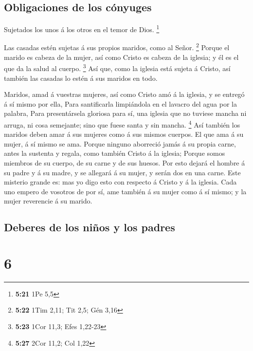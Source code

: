 \hypertarget{obligaciones-de-los-cuxf3nyuges}{%
\subsection{Obligaciones de los
cónyuges}\label{obligaciones-de-los-cuxf3nyuges}}

 Sujetados los unos á los otros en el temor de Dios.
\footnote{\textbf{5:21} 1Pe 5,5}

 Las casadas estén sujetas á sus propios maridos, como al
Señor. \footnote{\textbf{5:22} 1Tim 2,11; Tit 2,5; Gén 3,16}
 Porque el marido es cabeza de la mujer, así como Cristo es
cabeza de la iglesia; y él es el que da la salud al cuerpo. \footnote{\textbf{5:23}
  1Cor 11,3; Efes 1,22-23}  Así que, como la iglesia está
sujeta á Cristo, así también las casadas lo estén á sus maridos en todo.

 Maridos, amad á vuestras mujeres, así como Cristo amó á la
iglesia, y se entregó á sí mismo por ella,  Para
santificarla limpiándola en el lavacro del agua por la palabra,
 Para presentársela gloriosa para sí, una iglesia que no
tuviese mancha ni arruga, ni cosa semejante; sino que fuese santa y sin
mancha. \footnote{\textbf{5:27} 2Cor 11,2; Col 1,22}  Así
también los maridos deben amar á sus mujeres como á sus mismos cuerpos.
El que ama á su mujer, á sí mismo se ama.  Porque ninguno
aborreció jamás á su propia carne, antes la sustenta y regala, como
también Cristo á la iglesia;  Porque somos miembros de su
cuerpo, de su carne y de sus huesos.  Por esto dejará el
hombre á su padre y á su madre, y se allegará á su mujer, y serán dos en
una carne.  Este misterio grande es: mas yo digo esto con
respecto á Cristo y á la iglesia.  Cada uno empero de
vosotros de por sí, ame también á su mujer como á sí mismo; y la mujer
reverencie á su marido.

\hypertarget{deberes-de-los-niuxf1os-y-los-padres}{%
\subsection{Deberes de los niños y los
padres}\label{deberes-de-los-niuxf1os-y-los-padres}}

\hypertarget{section-5}{%
\section{6}\label{section-5}}

